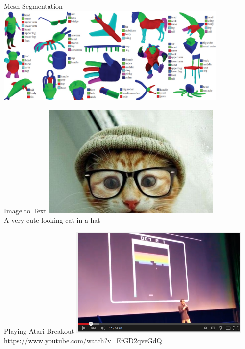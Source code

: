 \documentclass[serif,xcolor=pdftex,dvipsnames,table,hyperref={bookmarks=false,breaklinks}]{beamer}
\begin{document}
\begin{frame}[t]{Mesh Segmentation}
\center
\includegraphics[width=4.5in]{../Figures/mesh_segmentation.jpg}
\end{frame}

\begin{frame}[t]{Image to Text}
\center
\includegraphics[width=3.5in]{../Figures/cat-hat.jpg}\\
\pause A very cute looking cat in a hat
\end{frame}

\begin{frame}[t]{Playing Atari Breakout}
\center
\includegraphics[width=3.5in]{../Figures/atari-nn.png}\\
\url{https://www.youtube.com/watch?v=EfGD2qveGdQ}
\end{frame}
\end{document}
